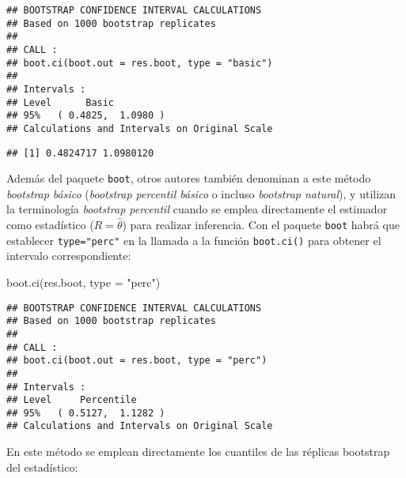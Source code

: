 \documentclass[
]{book}
\newenvironment{Shaded}{\begin{snugshade}}{\end{snugshade}}
\newcommand{\AttributeTok}[1]{\textcolor[rgb]{0.77,0.63,0.00}{#1}}
\newcommand{\CommentTok}[1]{\textcolor[rgb]{0.56,0.35,0.01}{\textit{#1}}}
\newcommand{\DecValTok}[1]{\textcolor[rgb]{0.00,0.00,0.81}{#1}}
\newcommand{\FunctionTok}[1]{\textcolor[rgb]{0.00,0.00,0.00}{#1}}
\newcommand{\NormalTok}[1]{#1}
\newcommand{\OtherTok}[1]{\textcolor[rgb]{0.56,0.35,0.01}{#1}}
\newcommand{\SpecialCharTok}[1]{\textcolor[rgb]{0.00,0.00,0.00}{#1}}
\newcommand{\StringTok}[1]{\textcolor[rgb]{0.31,0.60,0.02}{#1}}
\theoremstyle{break}
\theoremstyle{definition}
\theoremstyle{definition}
\theoremstyle{definition}
\theoremstyle{definition}
\theoremstyle{remark}
\begin{document}
\begin{verbatim}
## BOOTSTRAP CONFIDENCE INTERVAL CALCULATIONS
## Based on 1000 bootstrap replicates
## 
## CALL : 
## boot.ci(boot.out = res.boot, type = "basic")
## 
## Intervals : 
## Level      Basic         
## 95%   ( 0.4825,  1.0980 )  
## Calculations and Intervals on Original Scale
\end{verbatim}

\begin{Shaded}
\end{Shaded}

\begin{verbatim}
## [1] 0.4824717 1.0980120
\end{verbatim}

Además del paquete \texttt{boot}, otros autores también denominan a este método
\emph{bootstrap básico} (\emph{bootstrap percentil básico} o incluso \emph{bootstrap natural}),
y utilizan la terminología \emph{bootstrap percentil} cuando se emplea
directamente el estimador como estadístico (\(R = \hat \theta\)) para
realizar inferencia. Con el paquete \texttt{boot} habrá que establecer \texttt{type="perc"}
en la llamada a la función \texttt{boot.ci()} para obtener el intervalo
correspondiente:

\begin{Shaded}
\begin{Highlighting}[]
\FunctionTok{boot.ci}\NormalTok{(res.boot, }\AttributeTok{type =} \StringTok{"perc"}\NormalTok{)}
\end{Highlighting}
\end{Shaded}

\begin{verbatim}
## BOOTSTRAP CONFIDENCE INTERVAL CALCULATIONS
## Based on 1000 bootstrap replicates
## 
## CALL : 
## boot.ci(boot.out = res.boot, type = "perc")
## 
## Intervals : 
## Level     Percentile     
## 95%   ( 0.5127,  1.1282 )  
## Calculations and Intervals on Original Scale
\end{verbatim}

En este método se emplean directamente los cuantiles de las
réplicas bootstrap del estadístico:

\begin{Shaded}
\end{Shaded}
\end{document}
